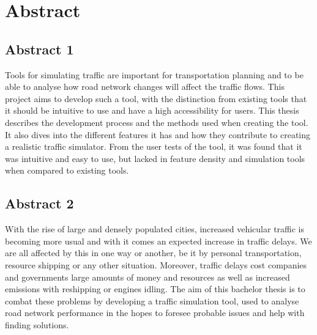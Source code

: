 


\thispagestyle{plain} 
\setlength{\parskip}{0pt plus 1.0pt}
\section*{Abstract}
    \subsection*{Abstract 1}
        Tools for simulating traffic are important for transportation planning and to be able to analyse how road network changes will affect the traffic flows. This project aims to develop such a tool, with the distinction from existing tools that it should be intuitive to use and have a high accessibility for users. This thesis describes the development process and the methods used when creating the tool. It also dives into the different features it has and how they contribute to creating a realistic traffic simulator. From the user tests of the tool, it was found that it was intuitive and easy to use, but lacked in feature density and simulation tools when compared to existing tools.

    
    \subsection*{Abstract 2}
        With the rise of large and densely populated cities, increased vehicular traffic is becoming more usual and with it comes an expected increase in traffic delays. We are all affected by this in one way or another, be it by personal transportation, resource shipping or any other situation. Moreover, traffic delays cost companies and governments large amounts of money and resources as well as increased emissions with reshipping or engines idling. The aim of this bachelor thesis is to combat these problems by developing a traffic simulation tool, used to analyse road network performance in the hopes to foresee probable issues and help with finding solutions.
    
